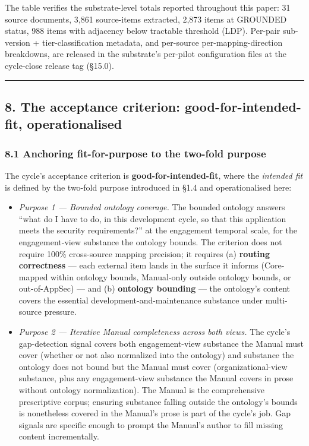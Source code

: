 \documentclass[
]{article}
\providecommand{\tightlist}{%
  \setlength{\itemsep}{0pt}\setlength{\parskip}{0pt}}
\begin{document}
The table verifies the substrate-level totals reported throughout this
paper: 31 source documents, 3,861 source-items extracted, 2,873 items at
GROUNDED status, 988 items with adjacency below tractable threshold
(LDP). Per-pair sub-version + tier-classification metadata, and
per-source per-mapping-direction breakdowns, are released in the
substrate's per-pilot configuration files at the cycle-close release tag
(§15.0).

\begin{center}\rule{0.5\linewidth}{0.5pt}\end{center}

\subsection{8. The acceptance criterion: good-for-intended-fit,
operationalised}\label{the-acceptance-criterion-good-for-intended-fit-operationalised}

\subsubsection{8.1 Anchoring fit-for-purpose to the two-fold
purpose}\label{anchoring-fit-for-purpose-to-the-two-fold-purpose}

The cycle's acceptance criterion is \textbf{good-for-intended-fit},
where the \emph{intended fit} is defined by the two-fold purpose
introduced in §1.4 and operationalised here:

\begin{itemize}
\tightlist
\item
  \emph{Purpose 1 --- Bounded ontology coverage.} The bounded ontology
  answers ``what do I have to do, in this development cycle, so that
  this application meets the security requirements?'' at the engagement
  temporal scale, for the engagement-view substance the ontology bounds.
  The criterion does not require 100\% cross-source mapping precision;
  it requires (a) \textbf{routing correctness} --- each external item
  lands in the surface it informs (Core-mapped within ontology bounds,
  Manual-only outside ontology bounds, or out-of-AppSec) --- and (b)
  \textbf{ontology bounding} --- the ontology's content covers the
  essential development-and-maintenance substance under multi-source
  pressure.
\item
  \emph{Purpose 2 --- Iterative Manual completeness across both views.}
  The cycle's gap-detection signal covers both engagement-view substance
  the Manual must cover (whether or not also normalized into the
  ontology) and substance the ontology does not bound but the Manual
  must cover (organizational-view substance, plus any engagement-view
  substance the Manual covers in prose without ontology normalization).
  The Manual is the comprehensive prescriptive corpus; ensuring
  substance falling outside the ontology's bounds is nonetheless covered
  in the Manual's prose is part of the cycle's job. Gap signals are
  specific enough to prompt the Manual's author to fill missing content
  incrementally.
\end{itemize}
\end{document}
